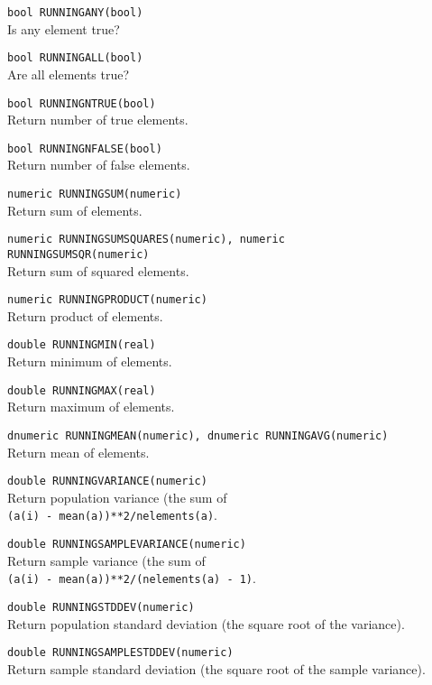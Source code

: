 \begin{description}
  \item[] \texttt{bool RUNNINGANY(bool)}\\
    Is any element true?
  \item[] \texttt{bool RUNNINGALL(bool)}\\
    Are all elements true?
  \item[] \texttt{bool RUNNINGNTRUE(bool)}\\
    Return number of true elements.
  \item[] \texttt{bool RUNNINGNFALSE(bool)}\\
    Return number of false elements.
  \item[] \texttt{numeric RUNNINGSUM(numeric)}\\
    Return sum of elements.
  \item[] \texttt{numeric RUNNINGSUMSQUARES(numeric), numeric RUNNINGSUMSQR(numeric)}\\
    Return sum of squared elements.
  \item[] \texttt{numeric RUNNINGPRODUCT(numeric)}\\
    Return product of elements.
  \item[] \texttt{double RUNNINGMIN(real)}\\
    Return minimum of elements.
  \item[] \texttt{double RUNNINGMAX(real)}\\
    Return maximum of elements.
  \item[] \texttt{dnumeric RUNNINGMEAN(numeric), dnumeric RUNNINGAVG(numeric)}\\
    Return mean of elements.
  \item[] \texttt{double RUNNINGVARIANCE(numeric)}\\
    Return population variance (the sum of
    \\\texttt{(a(i) - mean(a))**2/nelements(a)}.
  \item[] \texttt{double RUNNINGSAMPLEVARIANCE(numeric)}\\
    Return sample variance (the sum of
    \\\texttt{(a(i) - mean(a))**2/(nelements(a) - 1)}.
  \item[] \texttt{double RUNNINGSTDDEV(numeric)}\\
    Return population standard deviation (the square root of the variance).
  \item[] \texttt{double RUNNINGSAMPLESTDDEV(numeric)}\\
    Return sample standard deviation (the square root of the sample variance).

\end{description}
